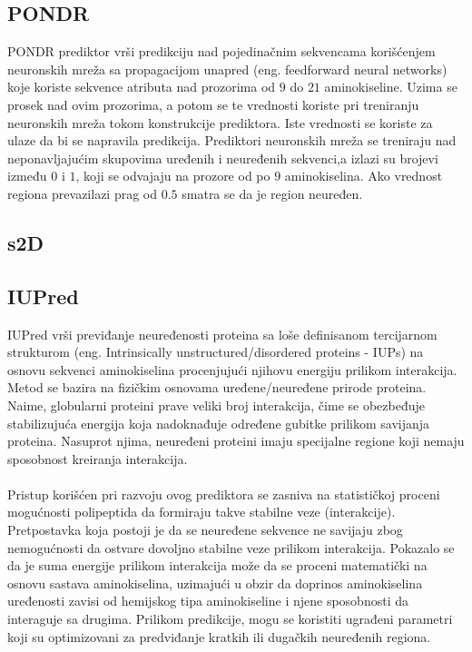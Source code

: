\subsection{PONDR}
PONDR prediktor vrši predikciju nad pojedinačnim sekvencama korišćenjem neuronskih mreža sa propagacijom unapred (eng. feedforward neural networks) koje koriste sekvence atributa nad prozorima od $9$ do $21$ aminokiseline. Uzima se prosek nad ovim prozorima, a potom se te vrednosti koriste pri treniranju neuronskih mreža tokom konstrukcije prediktora. Iste vrednosti se koriste za ulaze da bi se napravila predikcija. Prediktori neuronskih mreža se treniraju nad neponavljajućim skupovima uređenih i neuređenih sekvenci,a izlazi su brojevi između $0$ i $1$, koji se odvajaju na prozore od po $9$ aminokiselina. Ako vrednost regiona prevazilazi prag od $0.5$ smatra se da je region neuređen.



\subsection{s2D}


\subsection{IUPred}
IUPred vrši previđanje neuređenosti proteina sa loše definisanom tercijarnom strukturom (eng. Intrinsically unstructured/disordered proteins - IUPs) na osnovu sekvenci aminokiselina procenjujući njihovu energiju prilikom interakcija. Metod se bazira na fizičkim osnovama uređene/neuređene prirode proteina. Naime, globularni proteini prave veliki broj interakcija, čime se obezbeđuje stabilizujuća energija koja nadoknađuje određene gubitke prilikom savijanja proteina. Nasuprot njima, neuređeni proteini imaju specijalne regione koji nemaju sposobnost kreiranja interakcija.\\\\

Pristup korišćen pri razvoju ovog prediktora se zasniva na statističkoj proceni mogućnosti polipeptida da formiraju takve stabilne veze (interakcije). Pretpostavka koja postoji je da se neuređene sekvence ne savijaju zbog nemogućnosti da ostvare dovoljno stabilne veze prilikom interakcija. Pokazalo se da je suma energije prilikom interakcija može da se proceni matematički na osnovu sastava aminokiselina, uzimajući u obzir da doprinos aminokiselina uređenosti zavisi od hemijskog tipa aminokiseline i njene sposobnosti da interaguje sa drugima. Prilikom predikcije, mogu se koristiti ugrađeni parametri koji su optimizovani za predviđanje kratkih ili dugačkih neuređenih regiona. ~\cite{IUPred, IUPred1, IUPred2, IUPred3}


